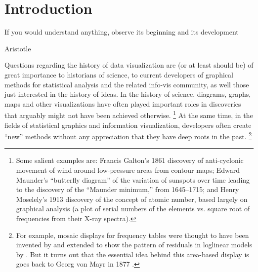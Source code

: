 \section{Introduction}\label{sec:intro}
\epigraph{If you would understand anything, observe its beginning and its development}{Aristotle}

Questions regarding the history of data visualization are (or at least should be) of great importance to historians of science,
to current developers of graphical methods for statistical analysis and the related info-vis community, as well
those just interested in the history of ideas.
In the history of science, diagrams, graphs, maps and other visualizations have often played important roles in discoveries
that arguably might not have been achieved otherwise.%
\footnote{
	Some salient examples are:
	Francis Galton's 1861
	discovery of anti-cyclonic movement of wind around low-pressure areas from contour maps;
	Edward Maunder's ``butterfly diagram'' of the variation of sunspots over time leading to the
	discovery of the ``Maunder minimum,'' from 1645--1715;
	and Henry Moselely's 1913 discovery of the concept of atomic number,
	based largely on graphical analysis (a plot of serial numbers of the elements vs.
	square root of frequencies from their X-ray spectra).
}
At the same time,
in the fields of statistical graphics and information visualization,
developers often create ``new'' methods without any appreciation that they have deep roots in the past.%
\footnote{
  For example, mosaic displays for frequency tables were thought to have been invented by
  \citet{HartiganKleiner:81} and extended to show the pattern of residuals in loglinear models by \citet{Friendly:94a}.
  But it turns out that the essential idea behind this area-based display is goes back 
  to Georg von Mayr in 1877 \citep{Friendly:2002:mosahist}.
}



